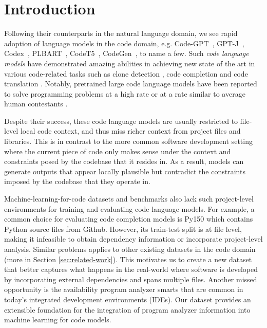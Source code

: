 \section{Introduction}
\label{sec:introduction}

Following their counterparts in the natural language domain, we see rapid adoption of language models in the code domain, e.g. Code-GPT~\citep{lu2021codexglue}, GPT-J~\citep{wang2021gpt-j}, Codex~\citep{chen2021evaluating}, PLBART~\citep{ahmad2021unified}, CodeT5~\citep{wang2021codet5}, CodeGen~\citep{nijkamp2022conversational}, to name a few.
Such \emph{code language models} have demonstrated amazing abilities in achieving new state of the art in various code-related tasks such as clone detection \citep{feng2020codebert,guo2020graphcodebert, ahmad2021unified, wang2021codet5}, code completion \citep{svyatkovskiy2020intellicode, kim2021code, lu2021codexglue, guo2022unixcoder} and code translation \citep{ahmad2021unified, wang2021codet5, guo2022unixcoder}.
Notably, pretrained large code language models have been reported to solve programming problems at a high rate \cite{chen2021evaluating} or at a rate similar to average human contestants \citep{li2022competition}.

Despite their success, these code language models are usually restricted to file-level local code context, and thus miss richer context from project files and libraries. 
This is in contrast to the more common software development setting where the current piece of code only makes sense under the context and constraints posed by the codebase that it resides in.
As a result, models can generate outputs that appear locally plausible but contradict the constraints imposed by the codebase that they operate in. 

Machine-learning-for-code datasets and benchmarks also lack such project-level environments for training and evaluating code language models.
For example, a common choice for evaluating code completion models is Py150 \citep{raychev2016probabilistic} which contains Python source files from Github. 
However, its train-test split is at file level, making it infeasible to obtain dependency information or incorporate project-level analysis. 
Similar problems applies to other existing datasets in the code domain (more in Section \ref{sec:related-work}). 
This motivates us to create a new dataset that better captures what happens in the real-world where software is developed by incorporating external dependencies and spans multiple files. 
Another missed opportunity is the availability program analyzer smarts that are common in today's integrated development environments (IDEs).
Our dataset provides an extensible foundation for the integration of program analyzer information into machine learning for code models.%

